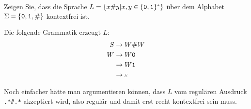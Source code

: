 Zeigen Sie, dass die Sprache $L=\{x{\tt\#}y|x,y\in\{{\tt 0},{\tt 1}\}^*\}$
über dem Alphabet $\Sigma = \{{\tt 0},{\tt 1},{\tt \#}\}$
kontextfrei ist.


\begin{loesung}
Die folgende Grammatik erzeugt $L$:
\begin{align*}
S&\to W {\tt \#} W\\
W&\to W{\tt 0}\\
 &\to W{\tt 1}\\
 &\to\varepsilon
\end{align*}

Noch einfacher hätte man argumentieren können, dass $L$
vom regulären Ausdruck {\tt .*\#.*} akzeptiert wird, also
regulär und damit erst recht kontextfrei sein muss.
\end{loesung}
